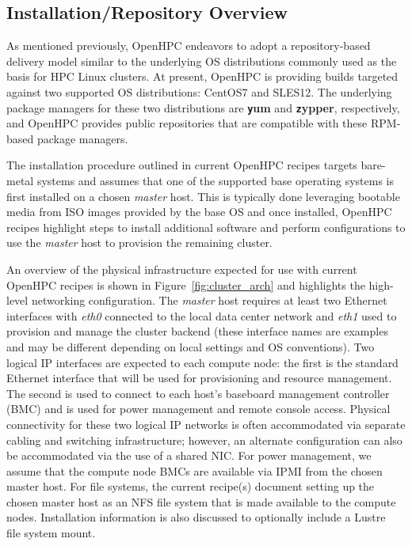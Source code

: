 \documentclass{sig-alternate-05-2015}
\begin{document}
\subsection{Installation/Repository Overview}
\label{sec:repo_enable}

As mentioned previously, OpenHPC endeavors to adopt a repository-based delivery
model similar to the underlying OS distributions commonly used as the basis for HPC
Linux clusters.  At present, OpenHPC is providing builds targeted against two
supported OS distributions: CentOS7 and SLES12. The underlying package
managers for these two distributions are {\bf \texttt yum} and {\bf \texttt zypper},
respectively, and OpenHPC provides public repositories that are compatible with
these RPM-based package managers.

The installation procedure outlined in current OpenHPC recipes targets
bare-metal systems and assumes that one of the supported base operating systems
is first installed on a chosen {\em master} host. This is typically done
leveraging bootable media from ISO images provided by the base OS and once
installed, OpenHPC recipes highlight steps to install additional software and
perform configurations to use the {\em master} host to provision the remaining
cluster.

An overview of the physical infrastructure expected for use with
current OpenHPC recipes is shown in
Figure~\ref{fig:cluster_arch} and highlights the high-level networking
configuration. The {\em master} host requires at least two Ethernet interfaces
with {\em eth0} connected to the local data center network and {\em eth1} used
to provision and manage the cluster backend (these interface names
are examples and may be different depending on local settings and OS
conventions). Two logical IP interfaces are expected to each compute node: the
first is the standard Ethernet interface that will be used for provisioning and
resource management. The second is used to connect to each host's baseboard
management controller (BMC) and is
used for power management and remote console access. Physical connectivity for
these two logical IP networks is often accommodated via separate cabling and
switching infrastructure; however, an alternate configuration can also be
accommodated via the use of a shared NIC.
For power management, we assume that the compute node 
BMCs are available via IPMI from the chosen master host. For file
systems, the current recipe(s) document setting up the chosen master
host as an NFS file system that is made available to the compute
nodes. Installation information is also discussed to optionally include a
Lustre~\cite{Lustre_url} file system mount.
\end{document}
